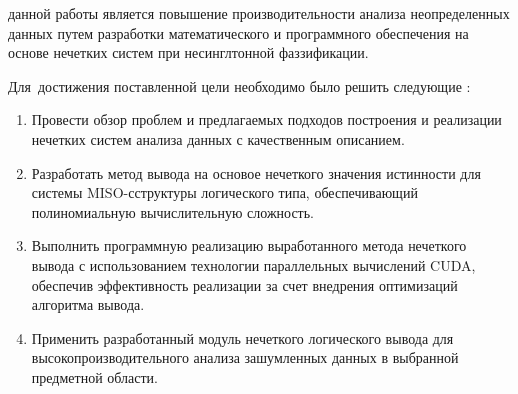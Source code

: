 \ifsynopsis
\else
\fi


{\aim} данной работы является повышение производительности анализа неопределенных данных путем разработки математического и программного обеспечения на основе нечетких систем при несинглтонной фаззификации.

Для~достижения поставленной цели необходимо было решить следующие {\tasks}:
\begin{enumerate}[beginpenalty=10000] %
  \item Провести обзор проблем и предлагаемых подходов построения и реализации нечетких систем анализа данных с качественным описанием.
  \item Разработать метод вывода на основое нечеткого значения истинности для системы MISO-сструктуры логического типа, обеспечивающий полиномиальную вычислительную сложность.
  \item Выполнить программную реализацию выработанного метода нечеткого вывода с использованием технологии параллельных вычислений CUDA, обеспечив эффективность реализации за счет внедрения оптимизаций алгоритма вывода.
  \item Применить разработанный модуль нечеткого логического вывода для высокопроизводительного анализа зашумленных данных в выбранной предметной области.
\end{enumerate}


